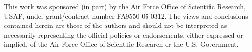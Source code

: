 This work was sponsored (in part) by the Air Force Office of Scientific Research, USAF, 
under grant/contract number FA9550-06-0312.  The views and conclusions contained herein 
are those of the authors and should not be interpreted as necessarily representing the 
official policies or endorsements, either expressed or implied, of the Air Force Office 
of Scientific Research or the U.S. Government.
